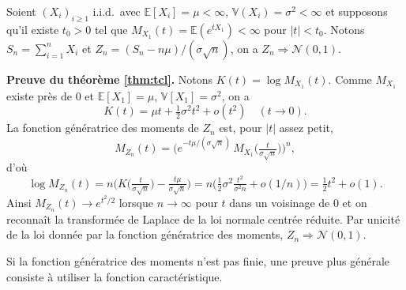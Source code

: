 \documentclass[10pt]{beamer}
\theoremstyle{plain}
\begin{document}
\begin{notes}

  \bigskip

\begin{theorem}\label{thm:tcl}
Soient $(X_i)_{i\ge1}$ i.i.d.\ avec $\mathbb E[X_i]=\mu<\infty$, $\mathbb V(X_i)=\sigma^2<\infty$
et supposons qu'il existe $t_0>0$ tel que $M_{X_1}(t)=\mathbb E(e^{tX_1})<\infty$ pour $|t|<t_0$.
Notons $S_n=\sum_{i=1}^n X_i$ et $Z_n=(S_n-n\mu)/(\sigma\sqrt n)$, on a $Z_n\Rightarrow\mathcal N(0,1)$.
\end{theorem}

\bigskip

\textbf{Preuve du théorème \ref{thm:tcl}.} Notons $K(t)=\log M_{X_1}(t)$. Comme $M_{X_1}$ existe près de $0$
et $\mathbb E [X_1]=\mu$, $\mathbb V [X_1]=\sigma^2$, on a
\[
K(t)=\mu t+\tfrac12\sigma^2t^2+o(t^2)\quad(t\to0).
\]
La fonction génératrice des moments  de $Z_n$ est, pour $|t|$ assez petit,
\[
M_{Z_n}(t)=\Big(e^{-t\mu/(\sigma\sqrt n)}\,M_{X_1}\!\big(\tfrac{t}{\sigma\sqrt n}\big)\Big)^n,
\]
d'où
\[
\log M_{Z_n}(t)=n\Big(K\!\big(\tfrac{t}{\sigma\sqrt n}\big)-\tfrac{t\mu}{\sigma\sqrt n}\Big)
= n\Big(\tfrac12\sigma^2 \tfrac{t^2}{\sigma^2 n}+o(1/n)\Big)=\tfrac12 t^2+o(1).
\]
Ainsi $M_{Z_n}(t)\to e^{t^2/2}$ lorsque $n\to\infty$ pour $t$ dans un
voisinage de $0$ et on reconnaît la transformée de Laplace de la loi
normale centrée réduite.  Par unicité de la loi donnée par la
fonction génératrice des moments, $Z_n\Rightarrow\mathcal N(0,1)$.\newline

Si la fonction génératrice des moments n'est pas finie, une preuve
plus générale consiste à utiliser la fonction caractéristique.

\end{notes}
\end{document}
